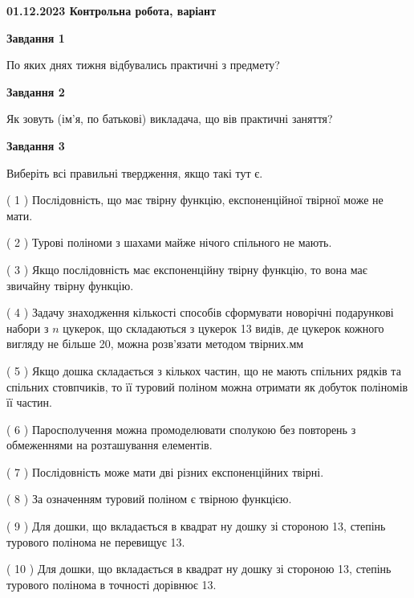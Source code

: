 \documentclass[12pt, ukrainian]{article}
\begin{document}
\begin {large}

\textbf{01.12.2023 Контрольна робота, варіант  }\par


{
{\begin {center}\textbf{Завдання 1}\end {center}}\par
По яких днях тижня відбувались практичні з предмету?\par
{\begin {center}\textbf{Завдання 2}\end {center}}\par
Як зовуть (ім'я, по батькові) викладача, що вів практичні заняття?\par
{\begin {center}\textbf{Завдання 3}\end {center}}\par
Виберіть всі правильні твердження, якщо такі тут є.\par
\vspace{2mm}
( 1 ) Послідовність, що має твірну функцію, експоненційної твірної може не мати.%

( 2 ) Турові поліноми з шахами майже нічого спільного не мають.%

( 3 ) Якщо послідовність має експоненційну твірну функцію, то вона має звичайну твірну функцію.%

( 4 ) Задачу знаходження кількості способів сформувати новорічні подарункові набори з $n$ цукерок, що складаються з цукерок 13 видів, де цукерок кожного вигляду не більше 20, можна розв’язати методом твірних.мм%

( 5 ) Якщо дошка складається з кількох частин, що не мають спільних рядків та спільних стовпчиків, то її туровий поліном можна отримати як добуток поліномів її частин.%

( 6 ) Паросполучення можна промоделювати сполукою без повторень з обмеженнями на розташування елементів.%

( 7 ) Послідовність може мати дві різних експоненційних твірні.%

( 8 ) За означенням туровий поліном є твірною функцією.%

( 9 ) Для дошки, що вкладається в квадрат ну дошку зі стороною 13, степінь турового полінома не перевищує 13.%

( 10 ) Для дошки, що вкладається в квадрат ну дошку зі стороною 13, степінь турового полінома в точності дорівнює 13.%
}
\end {large}

\vspace{4mm}
\newpage
\end{document}
